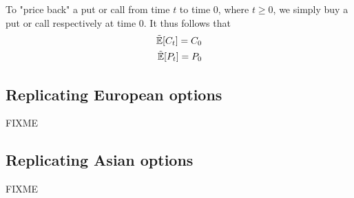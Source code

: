 \documentclass[reqno]{amsart}
\newcommand{\rE}[1]{\tilde{\E}[#1]}
\begin{document}
To "price back" a put or call from time $t$ to time $0$, where $t \geq 0$, we simply buy a put or call respectively at time $0$. 
It thus follows that 
\begin{align} \label{replicating puts/calls}
     \rE{C_t} = C_0 \\
     \rE{P_t} = P_0
\end{align}
\subsection{Replicating European options}
FIXME
\subsection{Replicating Asian options}
FIXME

\end{document}
